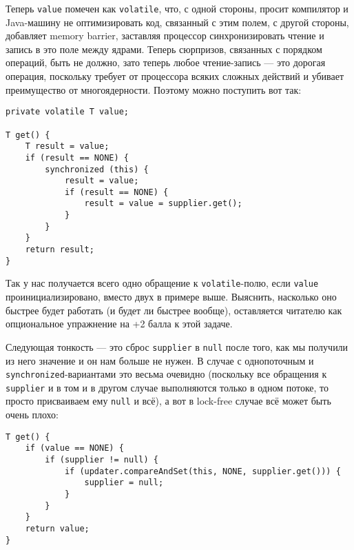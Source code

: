 \documentclass[a5paper]{article}
\begin{document}
Теперь \texttt{value} помечен как \texttt{volatile}, что, с одной стороны, просит компилятор и Java-машину не оптимизировать код, связанный с этим полем, с другой стороны, добавляет memory barrier, заставляя процессор синхронизировать чтение и запись в это поле между ядрами. Теперь сюрпризов, связанных с порядком операций, быть не должно, зато теперь любое чтение-запись --- это дорогая операция, поскольку требует от процессора всяких сложных действий и убивает преимущество от многоядерности. Поэтому можно поступить вот так:

\begin{verbatim}
private volatile T value;

T get() {
    T result = value;
    if (result == NONE) {
        synchronized (this) {
            result = value;
            if (result == NONE) {
                result = value = supplier.get();
            }
        }
    }
    return result;
}
\end{verbatim}

Так у нас получается всего одно обращение к \texttt{volatile}-полю, если \texttt{value} проинициализировано, вместо двух в примере выше. Выяснить, насколько оно быстрее будет работать (и будет ли быстрее вообще), оставляется читателю как опциональное упражнение на +2 балла к этой задаче.

Следующая тонкость --- это сброс \texttt{supplier} в \texttt{null} после того, как мы получили из него значение и он нам больше не нужен. В случае с однопоточным и \texttt{synchronized}-вариантами это весьма очевидно (поскольку все обращения к \texttt{supplier} и в том и в другом случае выполняются только в одном потоке, то просто присваиваем ему \texttt{null} и всё), а вот в lock-free случае всё может быть очень плохо:

\begin{verbatim}
T get() {
    if (value == NONE) {
        if (supplier != null) {
            if (updater.compareAndSet(this, NONE, supplier.get())) {
                supplier = null;
            }
        }
    }
    return value;
}
\end{verbatim}
\end{document}
